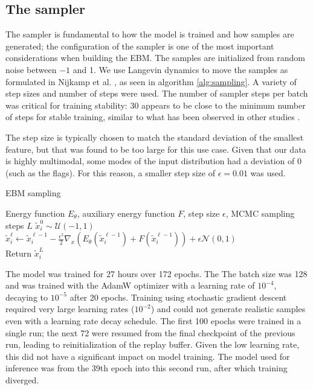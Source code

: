 \subsection{The sampler}

The sampler is fundamental to how the model is trained and how samples are generated; the configuration of the sampler is one of the most important considerations when building the EBM. The samples are initialized from random noise between $-1$ and 1. We use Langevin dynamics to move the samples as formulated in Nijkamp et al. \cite{nijkamp_anatomy_2020}, as seen in algorithm \ref{alg:sampling}. A variety of step sizes and number of steps were used. The number of sampler steps per batch was critical for training stability: 30 appears to be close to the minimum number of steps for stable training, similar to what has been observed in other studies \cite{cheng_versatile_2024}.

The step size is typically chosen to match the standard deviation of the smallest feature, but that was found to be too large for this use case. Given that our data is highly multimodal, some modes of the input distribution had a deviation of 0 (such as the flags).  For this reason, a smaller step size of $\epsilon = 0.01$ was used. 

\begin{algorithm}
\caption{EBM sampling}\label{alg:sampling}
\begin{algorithmic}
\Require Energy function $E_\theta$, auxiliary energy function $F$, step size $\epsilon$, MCMC sampling steps $L$
	\State $\tilde{x}_{i}^0 \sim \mathcal{U}(-1,1)$ 
	  
		\State $\tilde{x}_{i}^\ell \gets \tilde{x}_{i}^{\ell-1} - \frac{\epsilon^2}{2}\nabla_x \left( E_\theta(\tilde{x}_{i}^{\ell-1}) + F(\tilde{x}_{i}^{\ell-1}) \right)+ \epsilon \mathcal{N}(0, 1)$
	\EndFor
	\\
	\State Return $\tilde{x}_{i}^{L}$
	
\end{algorithmic}
\end{algorithm}

The model was trained for 27 hours over 172 epochs. The  The batch size was 128 and was trained with the AdamW optimizer with a learning rate of $10^{-4}$, decaying to $10^{-5}$ after 20 epochs. Training using stochastic gradient descent required very large learning rates ($10^{-2}$) and could not generate realistic samples even with a learning rate decay schedule. The first 100 epochs were trained in a single run; the next 72  were resumed from the final checkpoint of the previous run, leading to reinitialization of the replay buffer. Given the low learning rate, this did not have a significant impact on model training. The model used for inference was from the 39th epoch into this second run, after which training diverged. 


